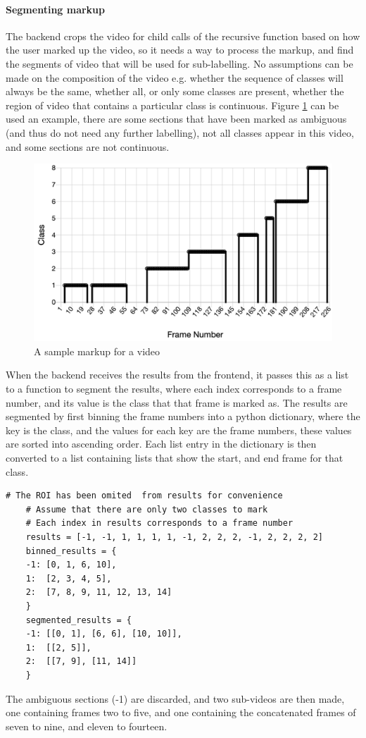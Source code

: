     \paragraph{Segmenting markup}
    The backend crops the video for child calls of the recursive function based on how the user marked up the video, so it needs a way to process the markup, and find the segments of video that will be used for sub-labelling. No assumptions can be made on the composition of the video e.g. whether the sequence of classes will always be the same, whether all, or only some classes are present, whether the region of video that contains a particular class is continuous. Figure \ref{fig:labelsample} can be used an example, there are some sections that have been marked as ambiguous (and thus do not need any further labelling), not all classes appear in this video, and some sections are not continuous.

    \begin{figure}[h]
        \centering
        \includegraphics[width=450px]{../img/sample_label.png}
        \caption{A sample markup for a video}
        \label{fig:labelsample}
    \end{figure}

    When the backend receives the results from the frontend, it passes this as a list to a function to segment the results, where each index corresponds to a frame number, and its value is the class that that frame is marked as. The results are segmented by first binning the frame numbers into a python dictionary, where the key is the class, and the values for each key are the frame numbers, these values are sorted into ascending order. Each list entry in the dictionary is then converted to a list containing lists that show the start, and end frame for that class.
    \begin{lstlisting}[style=PythonStyle]
    # The ROI has been omited  from results for convenience
    # Assume that there are only two classes to mark
    # Each index in results corresponds to a frame number
    results = [-1, -1, 1, 1, 1, 1, -1, 2, 2, 2, -1, 2, 2, 2, 2]
    binned_results = {
    -1: [0, 1, 6, 10],
    1:  [2, 3, 4, 5],
    2:  [7, 8, 9, 11, 12, 13, 14]
    }
    segmented_results = {
    -1: [[0, 1], [6, 6], [10, 10]],
    1:  [[2, 5]],
    2:  [[7, 9], [11, 14]]
    }\end{lstlisting}
    The ambiguous sections (-1) are discarded, and two sub-videos are then made, one containing frames two to five, and one containing the concatenated frames of seven to nine, and eleven to fourteen.


